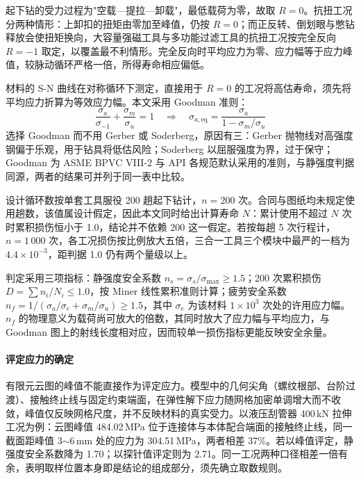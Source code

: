 起下钻的受力过程为"空载—提拉—卸载"，最低载荷为零，故取 $R=0$。抗扭工况分两种情形：上卸扣的扭矩由零加至峰值，仍按 $R=0$；而正反转、倒划眼与憋钻释放会使扭矩换向，大容量强磁工具与多功能过滤工具的抗扭工况按完全反向 $R=-1$ 取定，以覆盖最不利情形。完全反向时平均应力为零、应力幅等于应力峰值，较脉动循环严格一倍，所得寿命相应偏低。

材料的 S-N 曲线在对称循环下测定，直接用于 $R=0$ 的工况将高估寿命，须先将平均应力折算为等效应力幅。本文采用 Goodman 准则：
\begin{equation}
\frac{\sigma_a}{\sigma_{-1}}+\frac{\sigma_m}{\sigma_u}=1
\quad\Longrightarrow\quad
\sigma_{a,\mathrm{eq}}=\frac{\sigma_a}{1-\sigma_m/\sigma_u}
\label{eq:goodman}
\end{equation}
选择 Goodman 而不用 Gerber 或 Soderberg，原因有三：Gerber 抛物线对高强度钢偏于乐观，用于钻具将低估风险；Soderberg 以屈服强度为界，过于保守；Goodman 为 ASME BPVC VIII-2 与 API 各规范默认采用的准则，与静强度判据同源，两者的结果可并列于同一表中比较。

设计循环数按单套工具服役 200 趟起下钻计，$n=200$ 次。合同与图纸均未规定使用趟数，该值属设计假定，因此本文同时给出计算寿命 $N$：累计使用不超过 $N$ 次时累积损伤恒小于 1.0，结论并不依赖 200 这一假定。若按每趟 5 次行程计，$n=1\,000$ 次，各工况损伤按比例放大五倍，三合一工具三个模块中最严的一档为 $4.4\times10^{-3}$，距判据 1.0 仍有两个量级以上。

判定采用三项指标：静强度安全系数 $n_s=\sigma_s/\sigma_{\max}\ge1.5$；200 次累积损伤 $D=\sum n_i/N_i\le1.0$，按 Miner 线性累积准则计算；疲劳安全系数 $n_f=1/(\sigma_a/\sigma_e+\sigma_m/\sigma_u)\ge1.5$，其中 $\sigma_e$ 为该材料 $1\times10^{3}$ 次处的许用应力幅。$n_f$ 的物理意义为载荷尚可放大的倍数，其同时放大了应力幅与平均应力，与 Goodman 图上的射线长度相对应，因而较单一损伤指标更能反映安全余量。

\paragraph{评定应力的确定}
\label{ss:fatigue-probe}

有限元云图的峰值不能直接作为评定应力。模型中的几何尖角（螺纹根部、台阶过渡）、接触终止线与固定约束端面，在弹性解下应力随网格加密单调增大而不收敛，峰值仅反映网格尺度，并不反映材料的真实受力。以液压刮管器 400\,kN 拉伸工况为例：云图峰值 484.02\,MPa 位于连接体与本体配合端面的接触终止线，同一截面距峰值 3$\sim$6\,mm 处的应力为 304.51\,MPa，两者相差 37\%。若以峰值评定，静强度安全系数降为 1.70；以探针值评定则为 2.71。同一工况两种口径相差一倍有余，表明取样位置本身即是结论的组成部分，须先确立取数规则。

